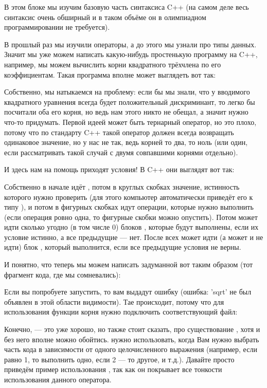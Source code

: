 В этом блоке мы изучим базовую часть синтаксиса C++ (на самом деле весь синтаксис очень обширный и в таком объёме он в олимпиадном программировании не требуется).

В прошлый раз мы изучили операторы, а до этого мы узнали про типы данных. Значит мы уже можем написать какую-нибудь простенькую программу на C++, например, мы можем вычислить корни квадратного трёхчлена по его коэффициентам. Такая программа вполне может выглядеть вот так:


Собственно, мы натыкаемся на проблему: если бы мы знали, что у вводимого квадратного уравнения всегда будет положительный дискриминант, то легко бы посчитали оба его корня, но ведь нам этого никто не обещал, а значит нужно что-то придумать. Первой идеей может быть тернарный оператор, но это плохо, потому что по стандарту C++ такой оператор должен всегда возвращать одинаковое значение, но у нас не так, ведь корней то два, то ноль (или один, если рассматривать такой случай с двумя совпавшими корнями отдельно).

И здесь нам на помощь приходят условия! В C++ они выглядят вот так:


Собственно в начале идёт  , потом в круглых скобках значение, истинность которого нужно проверить (для этого компьютер автоматически приведёт его к типу ), и потом в фигурных скобках идут операции, которые нужно выполнить (если операция ровно одна, то фигурные скобки можно опустить). Потом может идти сколько угодно (в том числе 0) блоков , которые будут выполнены, если их условие истинно, а все предыдущие — нет. После всех  может идти (а может и не идти) блок , который выполнится, если все предыдущие условия не верны.

И понятно, что теперь мы можем написать задуманной вот таким образом (тот фрагмент кода, где мы сомневались):


Если вы попробуете запустить, то вам выдадут ошибку  (ошибка: 'sqrt' не был объявлен в этой области видимости). Тае происходит, потому что для использования функции корня нужно подключить соответствующий файл:


Конечно,  — это уже хорошо, но также стоит сказать, про существование , хотя и без него вполне можно обойтись.  нужно использовать, когда Вам нужно выбрать часть кода в зависимости от одного целочисленного выражения (например, если  равно 1, то выполнить одно, если 2 — то другое, и т.д.). Давайте просто приведём пример использования , так как он покрывает все тонкости использования данного оператора.

